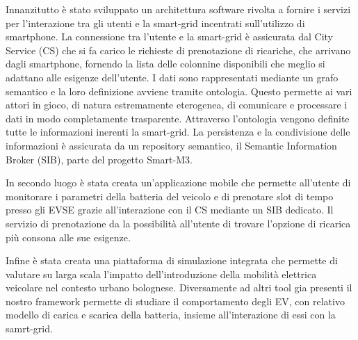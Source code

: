 Innanzitutto è stato sviluppato un architettura software rivolta a fornire i servizi per l'interazione tra gli utenti e la smart-grid incentrati sull'utilizzo di smartphone. La connessione tra l'utente e la smart-grid è assicurata dal City Service (CS) che si fa carico le richieste di prenotazione di ricariche, che arrivano dagli smartphone, fornendo la lista delle colonnine disponibili che meglio si adattano alle esigenze dell'utente. I dati sono rappresentati mediante un grafo semantico e la loro definizione avviene tramite ontologia. Questo permette ai vari attori in gioco, di natura estremamente eterogenea, di comunicare e processare i dati in modo completamente trasparente. Attraverso l'ontologia vengono definite tutte le informazioni inerenti la smart-grid. La persistenza e la condivisione delle informazioni è assicurata da un repository semantico, il Semantic Information Broker (SIB), parte del progetto Smart-M3. 

In secondo luogo è stata creata un'applicazione mobile che permette all'utente di monitorare i parametri della batteria del veicolo e di prenotare slot di tempo presso gli EVSE grazie all'interazione con il CS mediante un SIB dedicato. Il servizio di prenotazione da la possibilità all'utente di trovare l'opzione di ricarica più consona alle sue esigenze.

Infine è stata creata una piattaforma di simulazione integrata che permette di valutare su larga scala
l'impatto dell'introduzione della mobilità elettrica veicolare nel contesto urbano bolognese. Diversamente ad altri tool gia presenti il nostro framework permette di studiare il comportamento degli EV, con relativo modello di carica e scarica della batteria, insieme all'interazione di essi con la samrt-grid. 






